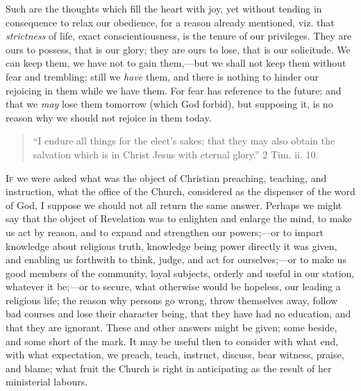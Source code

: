 Such are the thoughts which fill the heart with joy, yet without
tending in consequence to relax our obedience, for a reason already
mentioned, viz. that \emph{strictness} of life, exact
conscientiousness, is the tenure of our privileges. They are ours to
possess, that is our glory; they are ours to lose, that is our
solicitude. We can keep them, we have not to gain them,—but we shall
not keep them without fear and trembling; still we \emph{have} them,
and there is nothing to hinder our rejoicing in them while we have
them. For fear has reference to the future; and that we \emph{may}
lose them tomorrow (which God forbid), but supposing it, is no reason
why we should not rejoice in them today.


\begin{quote}

``I endure all things for the elect's sakes; that they may
also obtain the salvation which is in Christ Jesus with eternal
glory.'' 2 Tim. ii. 10.

\end{quote}

I\textsc{f} we were asked what was the object of Christian preaching,
teaching, and instruction, what the office of the Church, considered
as the dispenser of the word of God, I suppose we should not all
return the same answer. Perhaps we might say that the object of
Revelation was to enlighten and enlarge the mind, to make us act by
reason, and to expand and strengthen our powers;—or to impart
knowledge about religious truth, knowledge being power directly it was
given, and enabling us forthwith to think, judge, and act for
ourselves;—or to make us good members of the community, loyal
subjects, orderly and useful in our station, whatever it be;—or to
secure, what otherwise would be hopeless, our leading a religious
life; the reason why persons go wrong, throw themselves away, follow
bad courses and lose their character being, that they have had no
education, and that they are ignorant. These and other answers might
be given; some beside, and some short of the mark. It may be useful
then to consider with what end, with what expectation, we preach,
teach, instruct, discuss, bear witness, praise, and blame; what fruit
the Church is right in anticipating as the result of her ministerial
labours.

